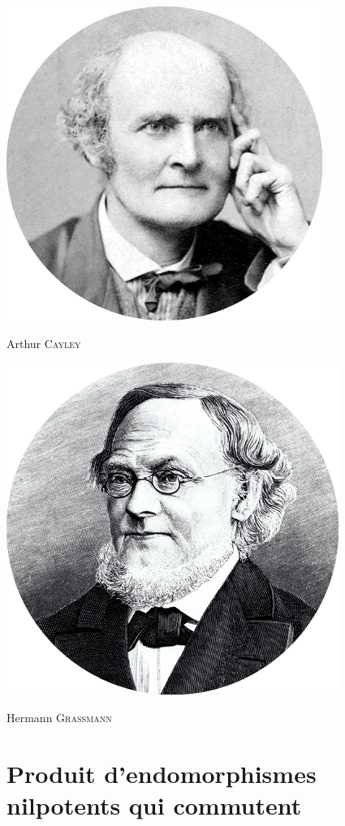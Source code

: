 \begin{marginfigure}[-13cm]
    \includegraphics{images/arthur_cayley.png}
    \caption{Arthur \textsc{Cayley}}
\end{marginfigure}

\begin{marginfigure}[-7cm]
    \includegraphics{images/hermann_grassmann.png}
    \caption{Hermann \textsc{Grassmann}}
\end{marginfigure}

\section{Produit d'endomorphismes nilpotents qui commutent}


